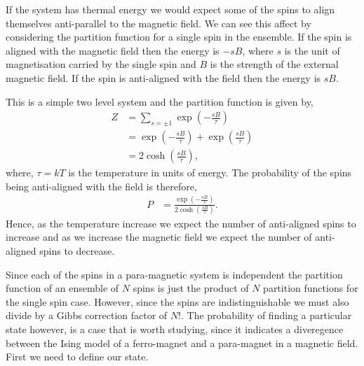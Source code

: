 \documentclass[a4paper]{article}
\begin{document}
\begin{multicols}{2}
        If the system has thermal energy we would expect some of the %
        spins to align themselves anti-parallel to the magnetic field. %
        We can see this affect by considering the partition function %
        for a single spin in the ensemble. If the spin is aligned with %
        the magnetic field then the energy is \(-sB\), where \(s\) is %
        the unit of magnetisation carried by the single spin and \(B\) %
        is the strength of the external magnetic field. If the spin is %
        anti-aligned with the field then the energy is \(sB\). 


        This is a simple two level system and the partition function %
        is given by, 
        \begin{align}
            Z &= \sum_{s = \pm 1}\exp\left(-\frac{sB}{\tau}\right)\nonumber\\
                &= \exp\left(-\frac{sB}{\tau}\right) + 
                    \exp\left(\frac{sB}{\tau}\right)\nonumber\\
                &= 2\cosh\left(\frac{sB}{\tau}\right),
            \label{eqn:1}
        \end{align}
        where, \(\tau = kT\) is the temperature in units of energy. %
        The probability of the spins being anti-aligned with the %
        field is therefore, 
        \begin{align}
            P &= \frac{\exp\left(-\frac{sB}{\tau}\right)}
                    {2\cosh\left(\frac{sB}{\tau}\right)}.
            \label{eqn:2}
        \end{align}
        Hence, as the temperature increase we expect the number of %
        anti-aligned spins to increase and as we increase the %
        magnetic field we expect the number of anti-aligned spins %
        to decrease. 


        Since each of the spins in a para-magnetic system is independent %
        the partition function of an ensemble of \(N\) spins is just %
        the product of \(N\) partition functions for the single spin %
        case. However, since the spins are indistinguishable we must %
        also divide by a Gibbs correction factor of \(N!\). %
        The probability of finding a particular state however, %
        is a case that is worth studying, since it indicates a %
        diveregence between the Ising model of a ferro-magnet and %
        a para-magnet in a magnetic field. First we need to define %
        our state. 



\end{multicols}
\end{document}
